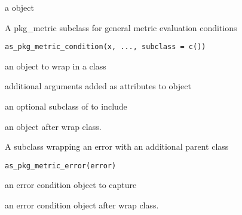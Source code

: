 \documentclass[a4paper]{book}
\begin{document}
%
\begin{Value}
a  object
\end{Value}
%
\begin{Description}
A pkg\_metric subclass for general metric evaluation conditions
\end{Description}
%
\begin{Usage}
\begin{verbatim}
as_pkg_metric_condition(x, ..., subclass = c())
\end{verbatim}
\end{Usage}
%
\begin{Arguments}
\begin{ldescription}
\item[\code{x}] an object to wrap in a  class

\item[\code{...}] additional arguments added as attributes to object 

\item[\code{subclass}] an optional subclass of  to
include
\end{ldescription}
\end{Arguments}
%
\begin{Value}
an object after wrap  class.
\end{Value}
%
\begin{Description}
A subclass wrapping an error with an additional parent class
\end{Description}
%
\begin{Usage}
\begin{verbatim}
as_pkg_metric_error(error)
\end{verbatim}
\end{Usage}
%
\begin{Arguments}
\begin{ldescription}
\item[\code{error}] an error condition object to capture
\end{ldescription}
\end{Arguments}
%
\begin{Value}
an error condition object after wrap  class.
\end{Value}
\end{document}
